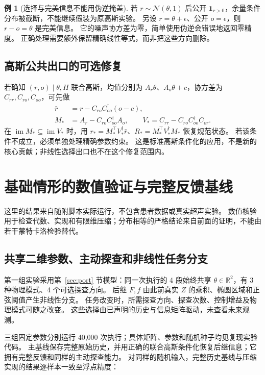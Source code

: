 \documentclass[UTF8,fontset=fandol,11pt,a4paper]{ctexart}
\newcommand{\R}{\mathbb R}
\newcommand{\N}{\mathcal N}
\newcommand{\im}{\operatorname{im}}
\theoremstyle{definition}
\newtheorem{example}[theorem]{例}
\theoremstyle{remark}
\numberwithin{equation}{section}
\begin{document}
\begin{example}[选择与完美信息不能用伪逆掩盖]
若 $r\sim\N(\theta,1)$ 后公开 $\mathbf1_{r>0}$，余量条件分布被截断，不能继续假装为原高斯实验。
另设 $r=\theta+\epsilon$、公开 $o=\epsilon$，则 $r-o=\theta$ 是完美信息。
它的噪声协方差为零，简单使用伪逆会错误地返回零精度。
正确处理需要额外保留精确线性等式，而非把这些方向删除。
\end{example}

\subsection{高斯公共出口的可选修复}
若确知 $(r,o)\mid\theta,H$ 联合高斯，均值分别为 $A_r\theta$、$A_o\theta+c$，协方差为 $C_{rr},C_{ro},C_{oo}$，可先做
\begin{align}
 \bar r&=r-C_{ro}C_{oo}^\dagger(o-c),\\
 M_*&=A_r-C_{ro}C_{oo}^\dagger A_o,\qquad
 V_*=C_{rr}-C_{ro}C_{oo}^\dagger C_{or}.
\end{align}
在 $\im M_*\subseteq\im V_*$ 时，用
$r_*=M_*^\top V_*^\dagger\bar r$、$R_*=M_*^\top V_*^\dagger M_*$ 恢复规范状态。
若该条件不成立，必须单独处理精确参数约束。
这是标准高斯条件化的应用，不是新的核心贡献；非线性选择出口也不在这个修复范围内。

\section{基础情形的数值验证与完整反馈基线}
\label{sec:validation}

这里的结果来自随附脚本实际运行，不包含患者数据或真实超声实验。
数值核验用于检查代数、实现和有限维压缩；分布相等的严格结论来自前面的证明，不能由若干蒙特卡洛检验替代。

\subsection{共享二维参数、主动探查和非线性任务分支}
第一组实验采用第~\ref{sec:port} 节模型：同一次执行的 4 段始终共享 $\theta\in\R^2$，有 3 种物理模式、4 个可选探查方向。
后继 $F,f$ 由此前真实 $Z$ 的乘积、椭圆区域和正弦阈值产生非线性分支。
任务改变时，所需探查方向、探查次数、控制增益及物理模式可随之改变。
这些选择由已声明的历史与信息矩阵驱动，未查看未来观测。

三组固定参数分别运行 40,000 次执行；具体矩阵、参数和随机种子均见复现实验代码。
主基线保存完整原始历史，并用正确的联合高斯条件化恢复后继信息；它拥有完整反馈和同样的主动探查能力。
对同样的随机输入，完整历史基线与压缩实现的结果逐样本一致至浮点精度：
\end{document}
